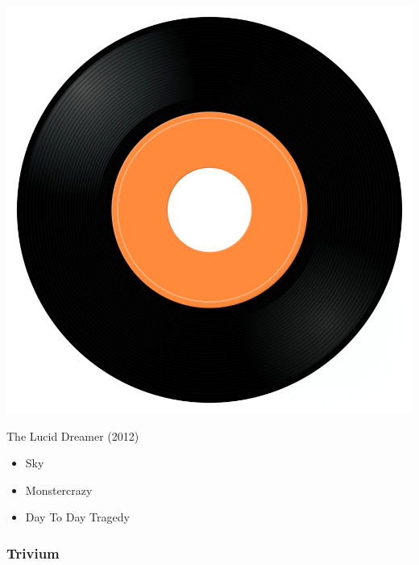 \begin{minipage}[t]{0.25\textwidth}
\captionsetup{type=figure}
\includegraphics[width=\textwidth]{Images/cover.png}
\caption*{The Lucid Dreamer (2012)}
\end{minipage}
\begin{minipage}[t]{0.25\textwidth}\vspace{0pt}
\begin{itemize}[nosep,leftmargin=1em,labelwidth=*,align=left]
	\setlength{\itemsep}{0pt}
	\item Sky
	\item Monstercrazy
	\item Day To Day Tragedy
\end{itemize}
\end{minipage}

\subsubsection{Trivium}

